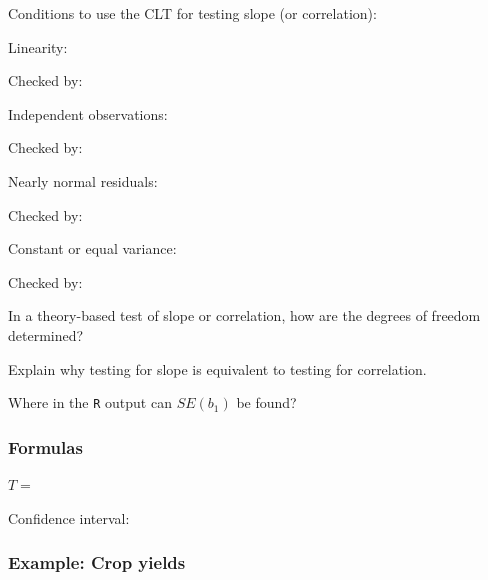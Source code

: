 \documentclass[
]{report}
\newcommand{\rgs}{\vspace{12pt}} %
\newcommand{\rgi}{\hspace{24pt}}  %
\begin{document}
\newpage

Conditions to use the CLT for testing slope (or correlation):

\rgi Linearity:
\rgs

\rgi \rgi Checked by:
\rgs

\rgi Independent observations:
\rgs

\rgi \rgi Checked by:
\rgs

\rgi Nearly normal residuals:
\rgs

\rgi \rgi Checked by:
\rgs

\rgi Constant or equal variance:
\rgs

\rgi \rgi Checked by:
\rgs

In a theory-based test of slope or correlation, how are the degrees of freedom determined?
\rgs    

Explain why testing for slope is equivalent to testing for correlation.
\rgs

Where in the \texttt{R} output can \(SE(b_1)\) be found?
\rgs

\hypertarget{formulas-11}{%
\subsubsection*{Formulas}\label{formulas-11}}

\(T=\)
\rgs

Confidence interval:
\rgs

\hypertarget{example-crop-yields}{%
\subsubsection*{Example: Crop yields}\label{example-crop-yields}}
\end{document}
